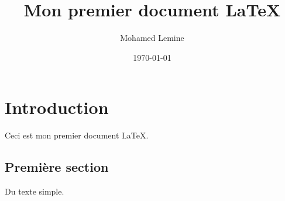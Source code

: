 \documentclass{article}
\begin{document}
\title{Mon premier document LaTeX}
\author{Mohamed Lemine}
\date{\today}
\maketitle

\section{Introduction}
Ceci est mon premier document LaTeX. 

\subsection{Première section}
Du texte simple.
\end{document}
